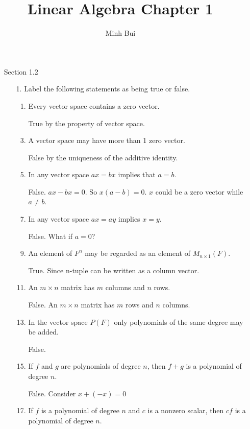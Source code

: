 \documentclass{article}
\author{Minh Bui}
\title{Linear Algebra Chapter 1}
\theoremstyle{claim}
\theoremstyle{definition}
\begin{document}
\maketitle
\begin{enumerate}
    \item[Section 1.2]
        \begin{enumerate}
            \item[1.] Label the following statements as being true or false.
                \begin{enumerate}
                    \item Every vector space contains a zero vector. 
                    \item[] True by the property of vector space.
                    \item A vector space may have more than 1 zero vector.
                    \item[] False by the uniqueness of the additive identity.
                    \item In any vector space $ax = bx$ implies that $a = b$.
                    \item[] False. $ax - bx = 0$. So $x(a - b) = 0$. $x$ could be a zero vector while $a \ne b$.
                    \item In any vector space $ax = ay$ implies $x = y$.
                    \item[] False. What if $a = 0$?
                    \item An element of $F^n$ may be regarded as an element of $M_{n \times 1}(F)$.
                    \item[] True. Since n-tuple can be written as a column vector.
                    \item An $m \times n$ matrix has $m$ columns and $n$ rows.
                    \item[] False. An $m \times n$ matrix has $m$ rows and $n$ columns.
                    \item In the vector space $P(F)$ only polynomials of the same degree may be added.
                    \item[] False.
                    \item If $f$ and $g$ are polynomials of degree $n$, then $f + g$ is a polynomial of degree $n$.
                    \item[] False. Consider $x + (-x) = 0$
                    \item If $f$ is a polynomial of degree $n$ and $c$ is a nonzero scalar, then $cf$ is a polynomial of degree $n$.

\end{enumerate}
\end{enumerate}
\end{enumerate}
\end{document}
